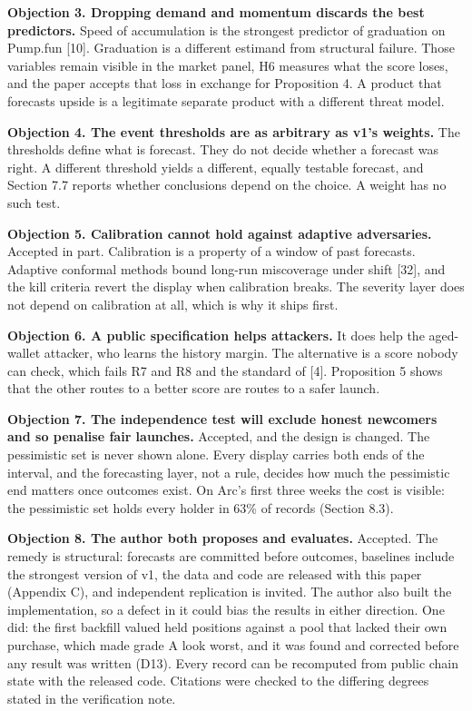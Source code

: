 \textbf{Objection 3. Dropping demand and momentum discards the best predictors.} Speed of accumulation is the strongest predictor of graduation on Pump.fun {[}10{]}. Graduation is a different estimand from structural failure. Those variables remain visible in the market panel, H6 measures what the score loses, and the paper accepts that loss in exchange for Proposition 4. A product that forecasts upside is a legitimate separate product with a different threat model.

\textbf{Objection 4. The event thresholds are as arbitrary as v1's weights.} The thresholds define what is forecast. They do not decide whether a forecast was right. A different threshold yields a different, equally testable forecast, and Section 7.7 reports whether conclusions depend on the choice. A weight has no such test.

\textbf{Objection 5. Calibration cannot hold against adaptive adversaries.} Accepted in part. Calibration is a property of a window of past forecasts. Adaptive conformal methods bound long-run miscoverage under shift {[}32{]}, and the kill criteria revert the display when calibration breaks. The severity layer does not depend on calibration at all, which is why it ships first.

\textbf{Objection 6. A public specification helps attackers.} It does help the aged-wallet attacker, who learns the history margin. The alternative is a score nobody can check, which fails R7 and R8 and the standard of {[}4{]}. Proposition 5 shows that the other routes to a better score are routes to a safer launch.

\textbf{Objection 7. The independence test will exclude honest newcomers and so penalise fair launches.} Accepted, and the design is changed. The pessimistic set is never shown alone. Every display carries both ends of the interval, and the forecasting layer, not a rule, decides how much the pessimistic end matters once outcomes exist. On Arc's first three weeks the cost is visible: the pessimistic set holds every holder in 63\% of records (Section 8.3).

\textbf{Objection 8. The author both proposes and evaluates.} Accepted. The remedy is structural: forecasts are committed before outcomes, baselines include the strongest version of v1, the data and code are released with this paper (Appendix C), and independent replication is invited. The author also built the implementation, so a defect in it could bias the results in either direction. One did: the first backfill valued held positions against a pool that lacked their own purchase, which made grade A look worst, and it was found and corrected before any result was written (D13). Every record can be recomputed from public chain state with the released code. Citations were checked to the differing degrees stated in the verification note.

